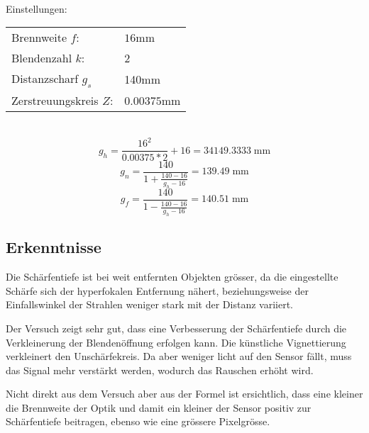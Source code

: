   ~\\[2em]
  Einstellungen:\\
  \begin{tabular}{l l}
    Brennweite $f$:        & $16$mm\\
    Blendenzahl $k$:       & 2 \\
    Distanzscharf $g_s$    & 140mm \\
    Zerstreuungskreis $Z$: & $0.00375$mm\\
  \end{tabular}

  ~\\[10em]

\[
  g_h=\frac{16^2}{0.00375*2}+16=34149.3333\;\text{mm}
\]
\[
  g_n=\frac{140}{1+\frac{140-16}{g_h-16}}=139.49\;\text{mm}
\]
\[
  g_f=\frac{140}{1-\frac{140-16}{g_h-16}}=140.51\;\text{mm}
\]

\subsection{Erkenntnisse}

Die Schärfentiefe ist bei weit entfernten Objekten grösser, da die eingestellte Schärfe sich der hyperfokalen Entfernung nähert, beziehungsweise der Einfallswinkel der Strahlen weniger stark mit der Distanz variiert.

Der Versuch zeigt sehr gut, dass eine Verbesserung der Schärfentiefe durch die Verkleinerung der Blendenöffnung erfolgen kann.
Die künstliche Vignettierung verkleinert den Unschärfekreis.
Da aber weniger licht auf den Sensor fällt, muss das Signal mehr verstärkt werden,
wodurch das Rauschen erhöht wird.

Nicht direkt aus dem Versuch aber aus der Formel ist ersichtlich, dass eine kleiner die Brennweite der Optik und damit ein kleiner der Sensor positiv zur Schärfentiefe beitragen, ebenso wie eine grössere Pixelgrösse.